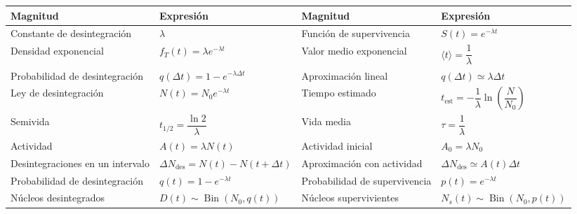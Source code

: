 \documentclass[12pt,a4paper]{article}
\begin{document}
\begin{table}[H]
\centering
\footnotesize
\renewcommand{\arraystretch}{1.45}
\begin{tabular}{@{}p{}p{}p{}p{}@{}}
\toprule
\textbf{Magnitud} & \textbf{Expresión} & \textbf{Magnitud} & \textbf{Expresión} \\
\midrule

Constante de desintegración &
$\lambda$ &
Función de supervivencia &
$S(t)=e^{-\lambda t}$ \\

\midrule

Densidad exponencial &
$f_T(t)=\lambda e^{-\lambda t}$ &
Valor medio exponencial &
$\langle t\rangle=\dfrac{1}{\lambda}$ \\

\midrule

Probabilidad de desintegración &
$q(\Delta t)=1-e^{-\lambda\Delta t}$ &
Aproximación lineal &
$q(\Delta t)\simeq \lambda\Delta t$ \\

\midrule

Ley de desintegración &
$N(t)=N_0e^{-\lambda t}$ &
Tiempo estimado &
$t_{\mathrm{est}}=-\dfrac{1}{\lambda}\ln\left(\dfrac{N}{N_0}\right)$ \\

\midrule

Semivida &
$t_{1/2}=\dfrac{\ln 2}{\lambda}$ &
Vida media &
$\tau=\dfrac{1}{\lambda}$ \\

\midrule

Actividad &
$A(t)=\lambda N(t)$ &
Actividad inicial &
$A_0=\lambda N_0$ \\

\midrule

Desintegraciones en un intervalo &
$\Delta N_{\mathrm{des}}=N(t)-N(t+\Delta t)$ &
Aproximación con actividad &
$\Delta N_{\mathrm{des}}\simeq A(t)\Delta t$ \\

\midrule

Probabilidad de desintegración &
$q(t)=1-e^{-\lambda t}$ &
Probabilidad de supervivencia &
$p(t)=e^{-\lambda t}$ \\

\midrule

Núcleos desintegrados &
$D(t)\sim \operatorname{Bin}(N_0,q(t))$ &
Núcleos supervivientes &
$N_s(t)\sim \operatorname{Bin}(N_0,p(t))$ \\


\end{tabular}
\end{table}
\end{document}
